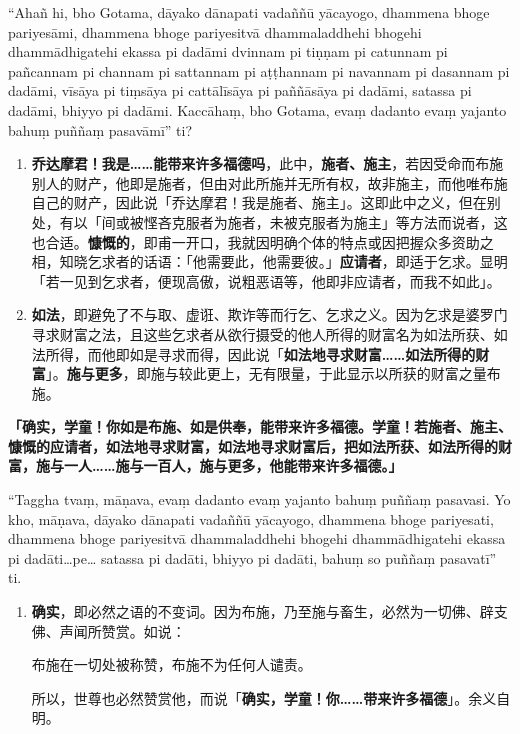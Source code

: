 “Ahañ hi, bho Gotama, dāyako dānapati vadaññū yācayogo, dhammena bhoge pariyesāmi, dhammena bhoge pariyesitvā dhammaladdhehi bhogehi dhammādhigatehi ekassa pi dadāmi dvinnam pi tiṇṇam pi catunnam pi pañcannam pi channam pi sattannam pi aṭṭhannam pi navannam pi dasannam pi dadāmi, vīsāya pi tiṃsāya pi cattālīsāya pi paññāsāya pi dadāmi, satassa pi dadāmi, bhiyyo pi dadāmi. Kaccāhaṃ, bho Gotama, evaṃ dadanto evaṃ yajanto bahuṃ puññaṃ pasavāmī” ti?

\begin{enumerate}\item \textbf{乔达摩君！我是……能带来许多福德吗}，此中，\textbf{施者、施主}，若因受命而布施别人的财产，他即是施者，但由对此所施并无所有权，故非施主，而他唯布施自己的财产，因此说「乔达摩君！我是施者、施主」。这即此中之义，但在别处，有以「间或被悭吝克服者为施者，未被克服者为施主」等方法而说者，这也合适。\textbf{慷慨的}，即甫一开口，我就因明确个体的特点或因把握众多资助之相，知晓乞求者的话语：「他需要此，他需要彼。」\textbf{应请者}，即适于乞求。显明「若一见到乞求者，便现高傲，说粗恶语等，他即非应请者，而我不如此」。
\item \textbf{如法}，即避免了不与取、虚诳、欺诈等而行乞、乞求之义。因为乞求是婆罗门寻求财富之法，且这些乞求者从欲行摄受的他人所得的财富名为如法所获、如法所得，而他即如是寻求而得，因此说「\textbf{如法地寻求财富……如法所得的财富}」。\textbf{施与更多}，即施与较此更上，无有限量，于此显示以所获的财富之量布施。\end{enumerate}

\textbf{「确实，学童！你如是布施、如是供奉，能带来许多福德。学童！若施者、施主、慷慨的应请者，如法地寻求财富，如法地寻求财富后，把如法所获、如法所得的财富，施与一人……施与一百人，施与更多，他能带来许多福德。」}

“Taggha tvaṃ, māṇava, evaṃ dadanto evaṃ yajanto bahuṃ puññaṃ pasavasi. Yo kho, māṇava, dāyako dānapati vadaññū yācayogo, dhammena bhoge pariyesati, dhammena bhoge pariyesitvā dhammaladdhehi bhogehi dhammādhigatehi ekassa pi dadāti…pe… satassa pi dadāti, bhiyyo pi dadāti, bahuṃ so puññaṃ pasavatī” ti.

\begin{enumerate}\item \textbf{确实}，即必然之语的不变词。因为布施，乃至施与畜生，必然为一切佛、辟支佛、声闻所赞赏。如说：\begin{quoting}布施在一切处被称赞，布施不为任何人谴责。\end{quoting}所以，世尊也必然赞赏他，而说「\textbf{确实，学童！你……带来许多福德}」。余义自明。\end{enumerate}

